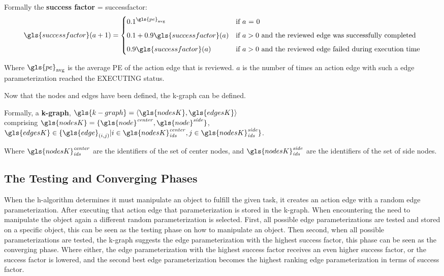 Formally the \textbf{success factor} = \gls{successfactor}:
\begin{equation}
\gls{successfactor}(a+1) =
  \begin{cases} 0.1^{\gls{pe}_\textrm{avg}}& \textrm{if $a$ = 0}\\[5px]
    0.1 + 0.9\gls{successfactor}(a) & \textrm{if $a > 0$ and the reviewed edge was successfully completed}\\[5px]
  0.9\gls{successfactor}(a) & \textrm{if $a > 0$ and the reviewed edge failed during execution time}
\end{cases}
\label{eq:success_factor}
\end{equation}

Where $\gls{pe}_\textrm{avg}$ is the average \ac{PE} of the action edge that is reviewed. $a$ is the number of times an action edge with such a edge parameterization reached the EXECUTING status.\bs

\noindent Now that the nodes and edges have been defined, the \ac{k-graph} can be defined.\bs

Formally, a \textbf{\acl{k-graph}}, $\gls{k-graph} = \left\langle \gls{nodesK}, \gls{edgesK} \right\rangle $
\\comprising $\gls{nodesK} = \{\gls{node}^{\mathit{center}}, \gls{node}^{\mathit{side}}\}$, \quad $\gls{edgesK} \in \{\gls{edge}_{(i,j)}| i \in \gls{nodesK}^\mathit{center}_\mathit{ids}, j \in \gls{nodesK}^\mathit{side}_\mathit{ids} \}$.\bs

Where $\gls{nodesK}^\mathit{center}_\mathit{ids}$ are the identifiers of the set of center nodes, and $\gls{nodesK}^\mathit{side}_\mathit{ids}$ are the identifiers of the set of side nodes.\bs

\subsection{The Testing and Converging Phases}
When the \ac{h-algorithm} determines it must manipulate an object to fulfill the given task, it creates an action edge with a random edge parameterization. After executing that action edge that parameterization is stored in the \ac{k-graph}. When encountering the need to manipulate the object again a different random parameterization is selected. First, all possible edge parameterizations are tested and stored on a specific object, this can be seen as the testing phase on how to manipulate an object. Then second, when all possible parameterizations are tested, the \ac{k-graph} suggests the edge parameterization with the highest success factor, this phase can be seen as the converging phase. Where either, the edge parameterization with the highest success factor receives an even higher success factor, or the success factor is lowered, and the second best edge parameterization becomes the highest ranking edge parameterization in terms of success factor.\bs


